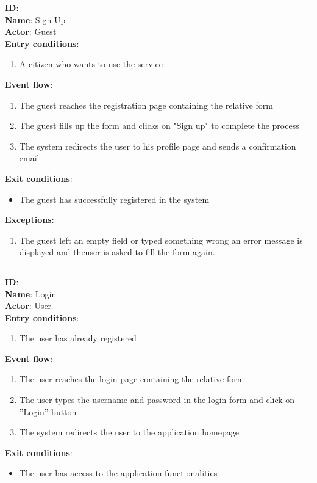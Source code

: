 	\textbf{ID}:  \\
	\textbf{Name}: Sign-Up \\
	\textbf{Actor}: Guest \\
	\textbf{Entry conditions}:
	\begin{enumerate}
		\item{A citizen who wants to use the service}
	\end{enumerate}
	\textbf{Event flow}:
	\begin{enumerate}
		\item{The guest reaches the registration page containing the relative form}
		\item{The guest ﬁlls up the form and clicks on "Sign up" to complete the process}
		\item{The system redirects the user to his proﬁle page and sends a conﬁrmation email}
	\end{enumerate}
	\textbf{Exit conditions}:
	\begin{itemize}
		\item{The guest has successfully registered in the system}
	\end{itemize}
	\textbf{Exceptions}:
	\begin{enumerate}
    		\item{The guest left an empty ﬁeld or typed something wrong an error message is displayed and theuser is asked to ﬁll the form again.}
 	   \end{enumerate}
	\rule{\linewidth}{0.4pt}
	\textbf{ID}:  \\
	\textbf{Name}: Login \\
	\textbf{Actor}: User \\
	\textbf{Entry conditions}:
	\begin{enumerate}
		\item{The user has already registered}
	\end{enumerate}
	\textbf{Event flow}:
	\begin{enumerate}
		\item{The user reaches the login page containing the relative form}
		\item{The user types the username and password in the login form and click on ”Login” button}
		\item{The system redirects the user to the application homepage}
	\end{enumerate}
	\textbf{Exit conditions}:
	\begin{itemize}
		\item{The user has access to the application functionalities}
	\end{itemize}
